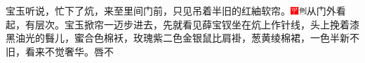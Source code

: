 宝玉听说，忙下了炕，来至里间门前，只见吊着半旧的红紬软帘。{\includegraphics[width=3mm]{../Images/00002}\includegraphics[width=3mm]{../Images/00011}\footnotesize \kaishu 从门外看起，有层次。}宝玉掀帘一迈步进去，先就看见薛宝钗坐在炕上作针线，头上挽着漆黑油光的䰖儿，蜜合色棉袄，玫瑰紫二色金银鼠比肩褂，葱黄绫棉裙，一色半新不旧，看来不觉奢华。唇不